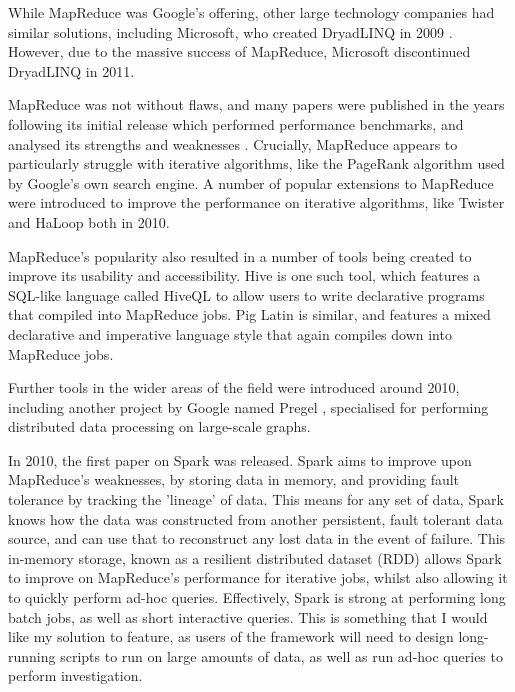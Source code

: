 While MapReduce was Google's offering, other large technology companies had similar solutions, including Microsoft, who created DryadLINQ in 2009 \cite{fetterly2009dryadlinq}. However, due to the massive success of MapReduce, Microsoft discontinued DryadLINQ in 2011.

MapReduce was not without flaws, and many papers were published in the years following its initial release which performed performance benchmarks, and analysed its strengths and weaknesses \cite{lee2012parallel}. Crucially, MapReduce appears to particularly struggle with iterative algorithms, like the PageRank algorithm used by Google's own search engine. A number of popular extensions to MapReduce were introduced to improve the performance on iterative algorithms, like Twister \cite{ekanayake2010twister} and HaLoop \cite{bu2010haloop} both in 2010. 

MapReduce's popularity also resulted in a number of tools being created to improve its usability and accessibility. Hive \cite{thusoo2010hive} is one such tool, which features a SQL-like language called HiveQL to allow users to write declarative programs that compiled into MapReduce jobs. Pig Latin \cite{olston2008pig} is similar, and features a mixed declarative and imperative language style that again compiles down into MapReduce jobs. 

Further tools in the wider areas of the field were introduced around 2010, including another project by Google named Pregel \cite{malewicz2010pregel}, specialised for performing distributed data processing on large-scale graphs.

In 2010, the first paper on Spark \cite{zaharia2010spark} was released. Spark aims to improve upon MapReduce's weaknesses, by storing data in memory, and providing fault tolerance by tracking the 'lineage' of data. This means for any set of data, Spark knows how the data was constructed from another persistent, fault tolerant data source, and can use that to reconstruct any lost data in the event of failure. This in-memory storage, known as a resilient distributed dataset (RDD) \cite{zaharia2012rdd} allows Spark to improve on MapReduce's performance for iterative jobs, whilst also allowing it to quickly perform ad-hoc queries.  Effectively, Spark is strong at performing long batch jobs, as well as short interactive queries. This is something that I would like my solution to feature, as users of the framework will need to design long-running scripts to run on large amounts of data, as well as run ad-hoc queries to perform investigation.

